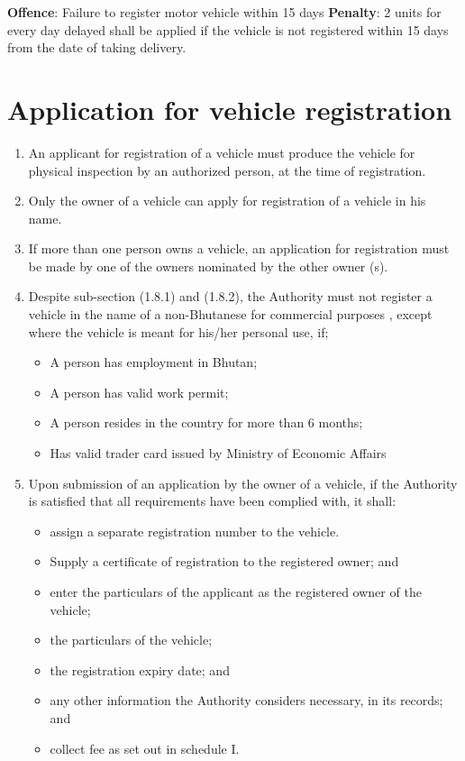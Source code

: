 \documentclass[
]{book}
\providecommand{\tightlist}{%
  \setlength{\itemsep}{0pt}\setlength{\parskip}{0pt}}
\begin{document}
\textbf{Offence}: Failure to register motor vehicle within 15 days
\textbf{Penalty}: 2 units for every day delayed shall be applied if the vehicle is not registered within 15 days from the date of taking delivery.

\hypertarget{application-for-vehicle-registration}{%
\section{Application for vehicle registration}\label{application-for-vehicle-registration}}

\begin{enumerate}
\def\labelenumi{\alph{enumi}.}
\tightlist
\item
  An applicant for registration of a vehicle must produce the vehicle for physical inspection by an authorized person, at the time of registration.\\
\item
  Only the owner of a vehicle can apply for registration of a vehicle in his name.
\item
  If more than one person owns a vehicle, an application for registration must be made by one of the owners nominated by the other owner (s).
\item
  Despite sub-section (1.8.1) and (1.8.2), the Authority must not register a vehicle in the name of a non-Bhutanese for commercial purposes , except where the vehicle is meant for his/her personal use, if;

  \begin{itemize}
  \tightlist
  \item
    A person has employment in Bhutan;
  \item
    A person has valid work permit;
  \item
    A person resides in the country for more than 6 months;
  \item
    Has valid trader card issued by Ministry of Economic Affairs
  \end{itemize}
\item
  Upon submission of an application by the owner of a vehicle, if the Authority is satisfied that all requirements have been complied with, it shall:

  \begin{itemize}
  \tightlist
  \item
    assign a separate registration number to the vehicle.
  \item
    Supply a certificate of registration to the registered owner; and
  \item
    enter the particulars of the applicant as the registered owner of the vehicle;
  \item
    the particulars of the vehicle;
  \item
    the registration expiry date; and
  \item
    any other information the Authority considers necessary, in its records; and
  \item
    collect fee as set out in schedule I.
  \end{itemize}
\end{enumerate}
\end{document}
